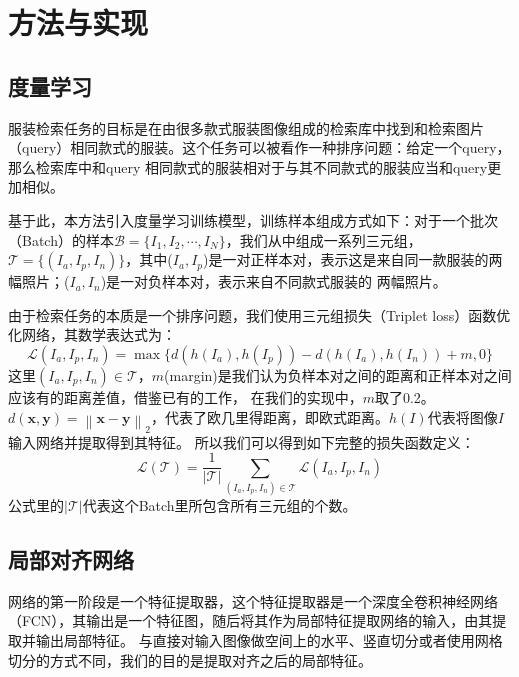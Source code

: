 \section{方法与实现}
\subsection{度量学习}
服装检索任务的目标是在由很多款式服装图像组成的检索库中找到和检索图片（query）相同款式的服装。这个任务可以被看作一种排序问题：给定一个query，那么检索库中和query
相同款式的服装相对于与其不同款式的服装应当和query更加相似。

基于此，本方法引入度量学习训练模型，训练样本组成方式如下：对于一个批次（Batch）的样本${\mathcal{B} = \{I_{1},I_{2},\cdots,I_{N}\}}$，我们从中组成一系列三元组，
${\mathcal{T} = \{(I_{a},I_{p},I_{n})\}}$，其中($I_{a},I_{p}$)是一对正样本对，表示这是来自同一款服装的两幅照片；($I_{a},I_{n}$)是一对负样本对，表示来自不同款式服装的
两幅照片。

由于检索任务的本质是一个排序问题，我们使用三元组损失（Triplet loss）函数优化网络，其数学表达式为：
\begin{equation}
\label{eq:partnet:1}
\mathcal{L}(I_{a},I_{p},I_{n}) = \max \{d(h(I_{a}),h(I_{p})) - d(h(I_{a}),h(I_{n})) + m,0\}
\end{equation}
这里$(I_{a},I_{p},I_{n}) \in \mathcal{T}$，$m$(margin)是我们认为负样本对之间的距离和正样本对之间应该有的距离差值，借鉴已有的工作\cite{schroff2015facenet}，
在我们的实现中，$m$取了0.2。$d(\mathbf{x},\mathbf{y})=\left\|{\mathbf{x} - \mathbf{y}}\right\|_{2}$，代表了欧几里得距离，即欧式距离。$h(I)$代表将图像$I$输入网络并提取得到其特征。
所以我们可以得到如下完整的损失函数定义：
\begin{equation}
\label{eq:partnet:2}
\mathcal{L}(\mathcal{T}) = \frac{1}{\left|\mathcal{T}\right|} \sum_{(I_{a},I_{p},I_{n}) \in \mathcal{T}} \mathcal{L}(I_{a},I_{p},I_{n})
\end{equation}
公式里的$\left|\mathcal{T}\right|$代表这个Batch里所包含所有三元组的个数。

\subsection{局部对齐网络}
网络的第一阶段是一个特征提取器，这个特征提取器是一个深度全卷积神经网络（FCN），其输出是一个特征图，随后将其作为局部特征提取网络的输入，由其提取并输出局部特征。
与直接对输入图像做空间上的水平、竖直切分或者使用网格切分的方式不同，我们的目的是提取对齐之后的局部特征。

